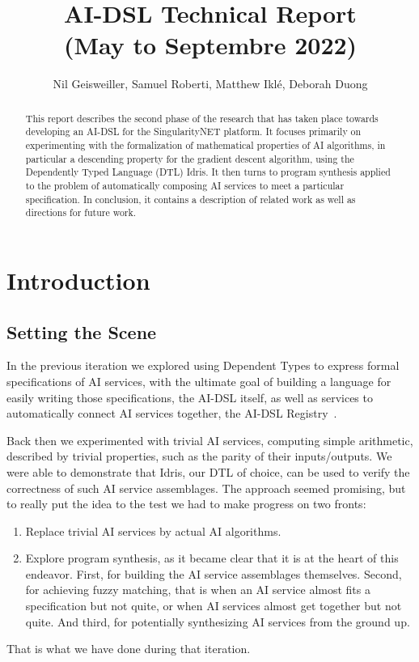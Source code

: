 \documentclass[]{report}
\begin{document}
\title{AI-DSL Technical Report\\(May to Septembre 2022)
}
\author{Nil Geisweiller, Samuel Roberti, Matthew Ikl\'e, Deborah Duong}
\maketitle

\begin{abstract}
  This report describes the second phase of the research that has
  taken place towards developing an AI-DSL for the SingularityNET
  platform.  It focuses primarily on experimenting with the
  formalization of mathematical properties of AI algorithms, in
  particular a descending property for the gradient descent algorithm,
  using the Dependently Typed Language (DTL) Idris.  It then turns to
  program synthesis applied to the problem of automatically composing
  AI services to meet a particular specification.  In conclusion, it
  contains a description of related work as well as directions for
  future work.
\end{abstract}

\tableofcontents

\chapter{Introduction}

\section{Setting the Scene}

In the previous iteration we explored using Dependent Types to express
formal specifications of AI services, with the ultimate goal of
building a language for easily writing those specifications, the
AI-DSL itself, as well as services to automatically connect AI
services together, the AI-DSL Registry~\cite{AIDSLReport2021}.

Back then we experimented with trivial AI services, computing simple
arithmetic, described by trivial properties, such as the parity of
their inputs/outputs.  We were able to demonstrate that Idris, our DTL
of choice, can be used to verify the correctness of such AI service
assemblages.  The approach seemed promising, but to really put the
idea to the test we had to make progress on two fronts:

\begin{enumerate}
\item Replace trivial AI services by actual AI algorithms.
\item Explore program synthesis, as it became clear that it is at the
  heart of this endeavor.  First, for building the AI service
  assemblages themselves.  Second, for achieving fuzzy matching, that
  is when an AI service almost fits a specification but not quite, or
  when AI services almost get together but not quite.  And third, for
  potentially synthesizing AI services from the ground up.
\end{enumerate}
That is what we have done during that iteration.
\end{document}
